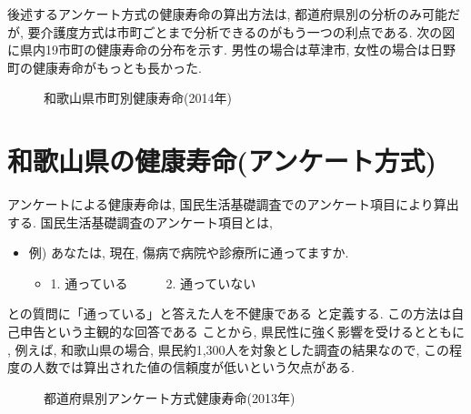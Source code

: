 後述するアンケート方式の健康寿命の算出方法は,
都道府県別の分析のみ可能だが,
要介護度方式は市町ごとまで分析できるのがもう一つの利点である.
次の図に県内19市町の健康寿命の分布を示す. 男性の場合は草津市, 女性の場合は日野町の健康寿命がもっとも長かった.

\begin{figure}[h!]
	\begin{center}
		\caption{和歌山県市町別健康寿命(2014年)}\label{fig1}
	\end{center}
\end{figure}



\section{和歌山県の健康寿命(アンケート方式)}
アンケートによる健康寿命は,
国民生活基礎調査でのアンケート項目により算出する.
国民生活基礎調査のアンケート項目とは,

\begin{itemize} \setlength{\itemsep}{-0.5mm} \setlength{\parskip}{-0.5mm}
	\item  例) あなたは, 現在, 傷病で病院や診療所に通ってますか.
	      \begin{itemize} \setlength{\itemsep}{-0.5mm} \setlength{\parskip}{-0.5mm}
		      \item 1. 通っている~~~~~~2. 通っていない
	      \end{itemize}
\end{itemize}
との質問に「通っている」と答えた人を不健康である
と定義する.
この方法は自己申告という主観的な回答である
ことから, 県民性に強く影響を受けるとともに
, 例えば, 和歌山県の場合, 県民約1,300人を対象とした調査の結果なので, この程度の人数では算出された値の信頼度が低いという欠点がある.

\begin{figure}[h!]
	\begin{center}
		\caption{都道府県別アンケート方式健康寿命(2013年)}\label{fig1}
	\end{center}
\end{figure}

